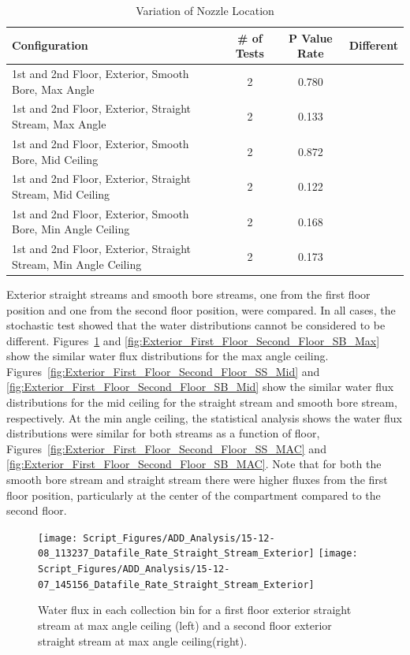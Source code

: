 \documentclass[12pt,oneside]{book}
\begin{document}
\begin{table}[!ht]
\centering
\small
\caption{Variation of Nozzle Location}
\label{tab:add_nozzlelocation}
\begin{tabular}{lccc}
\toprule[1.5pt]
Configuration & \# of Tests & P Value Rate & Different \\ 
\midrule
 1st and 2nd Floor, Exterior, Smooth Bore, Max Angle       & 2          & 0.780   &             \\
 1st and 2nd Floor, Exterior, Straight Stream, Max Angle   & 2          & 0.133   &             \\
 1st and 2nd Floor, Exterior, Smooth Bore, Mid Ceiling     & 2          & 0.872   &             \\
 1st and 2nd Floor, Exterior, Straight Stream, Mid Ceiling & 2          & 0.122   &             \\
 1st and 2nd Floor, Exterior, Smooth Bore, Min Angle Ceiling     & 2    & 0.168   &             \\
 1st and 2nd Floor, Exterior, Straight Stream, Min Angle Ceiling & 2    & 0.173   &             \\
\bottomrule[1.25pt]
\end{tabular}
\end{table}

Exterior straight streams and smooth bore streams, one from the first floor position and one from the second floor position, were compared. In all cases, the stochastic test showed that the water distributions cannot be considered to be different. Figures~\ref{fig:Exterior_First_Floor_Second_Floor_SS_Max} and \ref{fig:Exterior_First_Floor_Second_Floor_SB_Max} show the similar water flux distributions for the max angle ceiling. Figures~\ref{fig:Exterior_First_Floor_Second_Floor_SS_Mid} and \ref{fig:Exterior_First_Floor_Second_Floor_SB_Mid} show the similar water flux distributions for the mid ceiling for the straight stream and smooth bore stream, respectively. At the min angle ceiling, the statistical analysis shows the water flux distributions were similar for both streams as a function of floor, Figures~\ref{fig:Exterior_First_Floor_Second_Floor_SS_MAC} and \ref{fig:Exterior_First_Floor_Second_Floor_SB_MAC}. Note that for both the smooth bore stream and straight stream there were higher fluxes from the first floor position, particularly at the center of the compartment compared to the second floor.

\begin{figure}[ht]
\texttt{[image: Script\_Figures/ADD\_Analysis/15-12-08\_113237\_Datafile\_Rate\_Straight\_Stream\_Exterior]}
\texttt{[image: Script\_Figures/ADD\_Analysis/15-12-07\_145156\_Datafile\_Rate\_Straight\_Stream\_Exterior]} \\ 
\caption[Water Flux for Straight Stream Max Angle Varying Exterior Floor]{Water flux in each collection bin for a first floor exterior straight stream at max angle ceiling (left) and a second floor exterior straight stream at max angle ceiling(right).}
\label{fig:Exterior_First_Floor_Second_Floor_SS_Max}
\end{figure}
\end{document}
